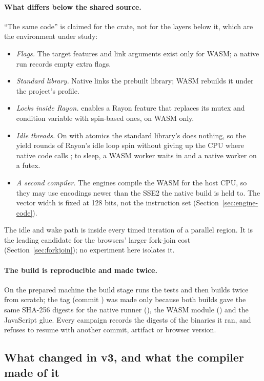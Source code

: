 \paragraph{What differs below the shared source.} ``The same code'' is
claimed for the crate, not for the layers below it, which are the
environment under study:
\begin{itemize}[leftmargin=1.5em]
\item \emph{Flags.} The target features and link arguments exist only for
WASM; a native run records empty extra flags.
\item \emph{Standard library.} Native links the prebuilt library; WASM
rebuilds it under the project's profile.
\item \emph{Locks inside Rayon.}  enables a Rayon
feature that replaces its mutex and condition variable with spin-based ones,
on WASM only.
\item \emph{Idle threads.} On  with atomics the standard
library's  does nothing, so the yield rounds of Rayon's
idle loop spin without giving up the CPU where native code calls
; to sleep, a WASM worker waits in
 and a native worker on a futex.
\item \emph{A second compiler.} The engines compile the WASM for the host
CPU, so they may use encodings newer than the SSE2 the native build is held
to. The vector width is fixed at 128 bits, not the instruction set
(Section~\ref{sec:engine-code}).
\end{itemize}
The idle and wake path is inside every timed iteration of a parallel
region. It is the leading candidate for the browsers' larger fork-join cost
(Section~\ref{sec:forkjoin}); no experiment here isolates it.

\paragraph{The build is reproducible and made twice.} On the prepared
machine the build stage runs the tests and then builds twice from scratch;
the tag  (commit ) was made only because
both builds gave the same SHA-256 digests for the native runner
(), the WASM module () and the
JavaScript glue. Every campaign records the digests of the binaries it ran,
and refuses to resume with another commit, artifact or browser version.

\subsection{What changed in v3, and what the compiler made of it}
\label{sec:codegen}

